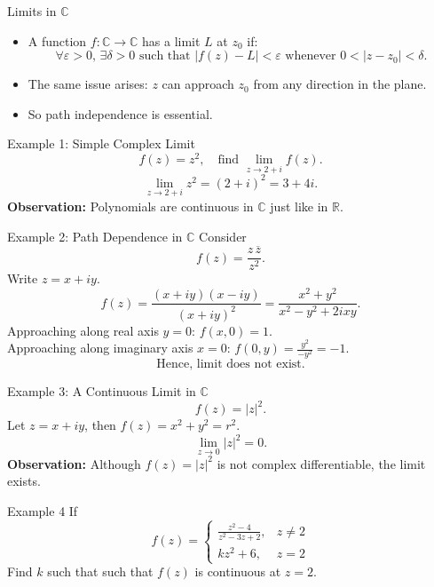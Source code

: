 \documentclass[11pt]{beamer}
\theoremstyle{plain}
\begin{document}
\begin{frame}{Limits in \(\mathbb{C}\)}
\begin{itemize}
    \item A function \(f:\mathbb{C}\to\mathbb{C}\) has a limit \(L\) at \(z_0\) if:
    \[
        \forall \varepsilon>0,\, \exists \delta>0 \text{ such that } |f(z)-L|<\varepsilon
        \text{ whenever } 0<|z-z_0|<\delta.
    \]
    \item The same issue arises: \(z\) can approach \(z_0\) from any direction in the plane.
    \item So path independence is essential.
\end{itemize}
\end{frame}

\begin{frame}{Example 1: Simple Complex Limit}
\[
    f(z)=z^2, \quad \text{find } \lim_{z\to 2+i} f(z).
\]
\pause
\[
    \lim_{z\to 2+i} z^2 = (2+i)^2 = 3 + 4i.
\]
\pause
\textbf{Observation:} Polynomials are continuous in \(\mathbb{C}\) just like in \(\mathbb{R}\).
\end{frame}

\begin{frame}{Example 2: Path Dependence in \(\mathbb{C}\)}
Consider
\[
    f(z) = \frac{z\,\overline{z}}{z^2}.
\]
Write \(z = x+iy\).
\pause
\[
    f(z) = \frac{(x+iy)(x-iy)}{(x+iy)^2} = \frac{x^2+y^2}{x^2 - y^2 + 2ixy}.
\]
\pause
Approaching along real axis \(y=0\): \(f(x,0)=1\).\\
Approaching along imaginary axis \(x=0\): \(f(0,y)=\frac{y^2}{-y^2}= -1.\)
\[
\boxed{\text{Hence, limit does not exist.}}
\]
\end{frame}

\begin{frame}{Example 3: A Continuous Limit in \(\mathbb{C}\)}
\[
    f(z)=|z|^2.
\]
\pause
Let \(z=x+iy\), then \(f(z)=x^2+y^2 = r^2.\)
\[
    \lim_{z\to 0} |z|^2 = 0.
\]
\pause
\textbf{Observation:} Although \(f(z)=|z|^2\) is not complex differentiable, the limit exists.
\end{frame}

\begin{frame}{Example 4}
    If 
    $$f(z)=\begin{cases}
        \frac{z^2-4}{z^2-3z+2}, &z\neq 2\\
        kz^2+6, &z=2 
    \end{cases}
    $$
    Find $k$ such that such that $f(z)$ is continuous at $z=2$.  
\end{frame}
\end{document}
